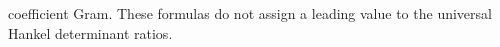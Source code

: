 coefficient Gram. These formulas do not assign a leading
value to the universal Hankel determinant ratios.